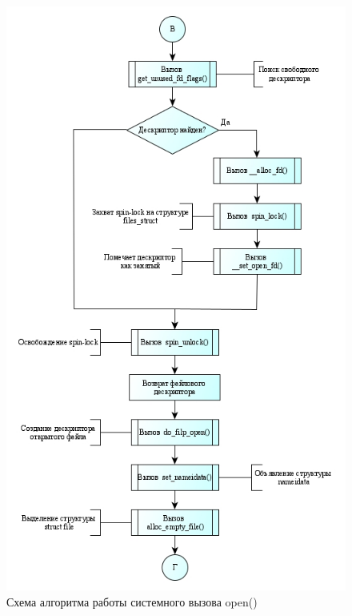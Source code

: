 \begin{figure}[h!]
	\caption{Схема алгоритма работы системного вызова open()}
	\center\includegraphics[scale=0.75]{img/3.jpg}
	
\end{figure}
